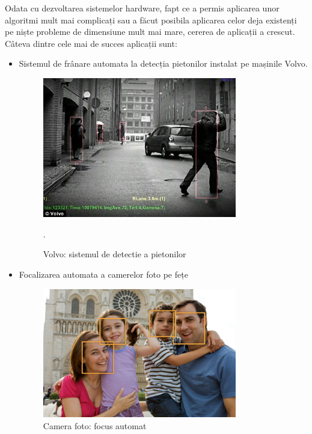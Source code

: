 Odata cu dezvoltarea sistemelor hardware, fapt ce a permis aplicarea unor algoritmi mult mai complicați sau a făcut posibila aplicarea celor deja existenți pe niște probleme de dimensiune mult mai mare, cererea de aplicații a crescut.
Câteva dintre cele mai de succes aplicații sunt: 
\begin{itemize}
	\item Sistemul de frânare automata la detecția pietonilor instalat pe mașinile Volvo.\cite{volvo}
	\begin{figure}[H]
		\centering
			\includegraphics[width=0.8\textwidth]{imagini/volvo_pedestrian_detection.jpg}
		\caption{Volvo: sistemul de detectie a pietonilor\cite{VolvoArticle}}.
		\label{fig:volvo_pedestrian_detection}
	\end{figure}
	
	\item Focalizarea automata a camerelor foto pe fețe		
	\begin{figure}[H]
		\centering
			\includegraphics[width=0.8\textwidth]{imagini/face_detection_2x.png}
		\caption{Camera foto: focus automat\cite{CanonFaceRecognition}}
		\label{fig:face_detection_2x}
	\end{figure}
	



\end{itemize}

